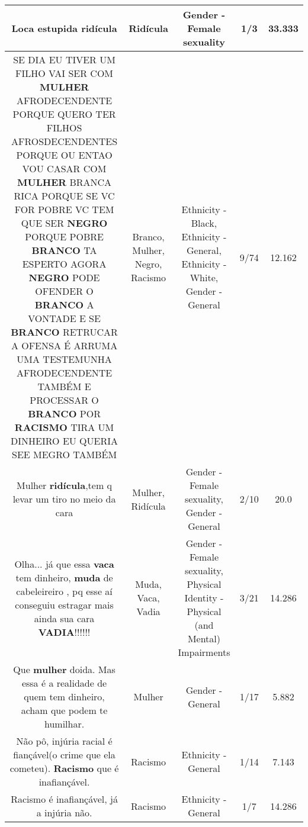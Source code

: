 \documentclass[11pt]{article}
\newlength\mylength
\begin{document}
\begin{center}
\begin{longtable}{|C{.65\mylength}|C{.30\mylength}|C{.12\mylength}|C{.12\mylength}|C{.12\mylength}|}
  \small Loca estupida ridícula\normalsize   & Ridícula & Gender - Female sexuality & 1/3 & 33.333 \\  \hline
  \small SE DIA EU TIVER UM FILHO VAI SER COM \textbf{MULHER} AFRODECENDENTE PORQUE QUERO TER FILHOS AFROSDECENDENTES PORQUE OU ENTAO VOU CASAR COM \textbf{MULHER} BRANCA RICA PORQUE SE VC FOR POBRE VC TEM QUE SER \textbf{NEGRO} PORQUE POBRE \textbf{BRANCO} TA ESPERTO AGORA \textbf{NEGRO} PODE OFENDER O \textbf{BRANCO} A VONTADE E SE \textbf{BRANCO} RETRUCAR A OFENSA É ARRUMA UMA TESTEMUNHA AFRODECENDENTE TAMBÉM E PROCESSAR O \textbf{BRANCO} POR \textbf{RACISMO} TIRA UM DINHEIRO EU QUERIA SEE MEGRO TAMBÉM\normalsize   & Branco, Mulher, Negro, Racismo & Ethnicity - Black, Ethnicity - General, Ethnicity - White, Gender - General & 9/74 & 12.162 \\  \hline
  \small Mulher \textbf{ridícula},tem q levar um tiro no meio da cara\normalsize   & Mulher, Ridícula & Gender - Female sexuality, Gender - General & 2/10 & 20.0 \\  \hline
  \small Olha... já que essa \textbf{vaca} tem dinheiro, \textbf{muda} de cabeleireiro , pq esse aí conseguiu estragar mais ainda sua cara \textbf{VADIA}!!!!!!\normalsize   & Muda, Vaca, Vadia & Gender - Female sexuality, Physical Identity - Physical (and Mental) Impairments & 3/21 & 14.286 \\  \hline
  \small Que \textbf{mulher} doida. Mas essa é a realidade de quem tem dinheiro, acham que podem te humilhar.\normalsize   & Mulher & Gender - General & 1/17 & 5.882 \\  \hline
  \small Não pô, injúria racial é fiançável(o crime que ela cometeu). \textbf{Racismo} que é inafiançável.\normalsize   & Racismo & Ethnicity - General & 1/14 & 7.143 \\  \hline
  \small Racismo é inafiançável, já a injúria não.\normalsize   & Racismo & Ethnicity - General & 1/7 & 14.286 \\  \hline

\end{longtable}
\end{center}
\end{document}
